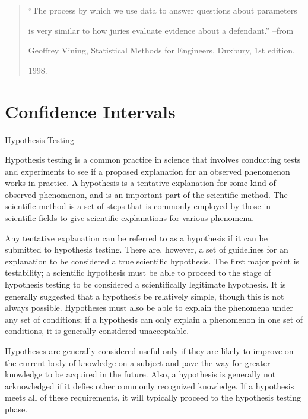  

\begin{quote}

“The process by which we use data to answer questions about parameters

is very similar to how juries evaluate evidence about a defendant.” –from

Geoffrey Vining, Statistical Methods for Engineers, Duxbury, 1st edition,

1998.

\end{quote}

\section{Confidence Intervals}

 

Hypothesis Testing

 



Hypothesis testing is a common practice in science that involves conducting tests and experiments to see if a proposed explanation for an observed phenomenon works in practice. A hypothesis is a tentative explanation for some kind of observed phenomenon, and is an important part of the scientific method. The scientific method is a set of steps that is commonly employed by those in scientific fields to give scientific explanations for various phenomena.

 

Any tentative explanation can be referred to as a hypothesis if it can be submitted to hypothesis testing. There are, however, a set of guidelines for an explanation to be considered a true scientific hypothesis. The first major point is testability; a scientific hypothesis must be able to proceed to the stage of hypothesis testing to be considered a scientifically legitimate hypothesis. It is generally suggested that a hypothesis be relatively simple, though this is not always possible. Hypotheses must also be able to explain the phenomena under any set of conditions; if a hypothesis can only explain a phenomenon in one set of conditions, it is generally considered unacceptable.

 

Hypotheses are generally considered useful only if they are likely to improve on the current body of knowledge on a subject and pave the way for greater knowledge to be acquired in the future. Also, a hypothesis is generally not acknowledged if it defies other commonly recognized knowledge. If a hypothesis meets all of these requirements, it will typically proceed to the hypothesis testing phase.


